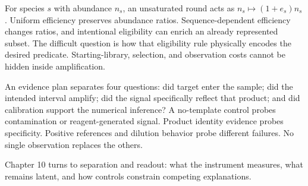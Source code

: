 For species $s$ with abundance $n_s$, an unsaturated round acts as $n_s\mapsto(1+e_s)n_s$. Uniform efficiency preserves abundance ratios. Sequence-dependent efficiency changes ratios, and intentional eligibility can enrich an already represented subset. The difficult question is how that eligibility rule physically encodes the desired predicate. Starting-library, selection, and observation costs cannot be hidden inside amplification.

An evidence plan separates four questions: did target enter the sample; did the intended interval amplify; did the signal specifically reflect that product; and did calibration support the numerical inference? A no-template control probes contamination or reagent-generated signal. Product identity evidence probes specificity. Positive references and dilution behavior probe different failures. No single observation replaces the others.

Chapter 10 turns to separation and readout: what the instrument measures, what remains latent, and how controls constrain competing explanations.

